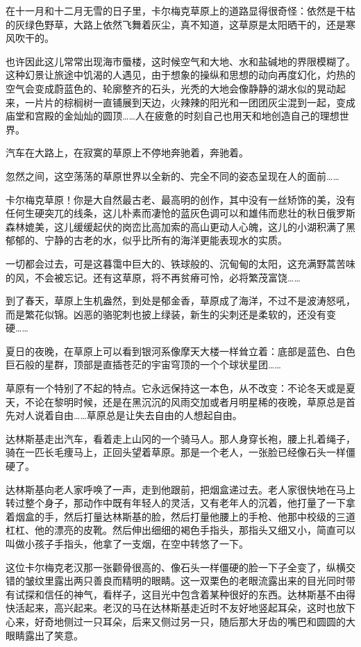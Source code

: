 在十一月和十二月无雪的日子里，卡尔梅克草原上的道路显得很奇怪：依然是干枯的灰绿色野草，大路上依然飞舞着灰尘，真不知道，这草原是太阳晒干的，还是寒风吹干的。

也许因此这儿常常出现海市蜃楼，这时候空气和大地、水和盐碱地的界限模糊了。这种幻景让旅途中饥渴的人遇见，由于想象的操纵和思想的动向再度幻化，灼热的空气会变成蔚蓝色的、轮廓整齐的石头，光秃的大地会像静静的湖水似的晃动起来，一片片的棕榈树一直铺展到天边，火辣辣的阳光和一团团灰尘混到一起，变成庙堂和宫殿的金灿灿的圆顶……人在疲惫的时刻自己也用天和地创造自己的理想世界。

汽车在大路上，在寂寞的草原上不停地奔驰着，奔驰着。

忽然之间，这空荡荡的草原世界以全新的、完全不同的姿态呈现在人的面前……

卡尔梅克草原！你是大自然最古老、最高明的创作，其中没有一丝矫饰的美，没有任何生硬突兀的线条，这儿朴素而凄怆的蓝灰色调可以和雄伟而悲壮的秋日俄罗斯森林媲美，这儿缓缓起伏的岗峦比高加索的高山更动人心魄，这儿的小湖积满了黑郁郁的、宁静的古老的水，似乎比所有的海洋更能表现水的实质。

一切都会过去，可是这暮霭中巨大的、铁球般的、沉甸甸的太阳，这充满野蒿苦味的风，不会被忘记。还有这草原，将不再贫瘠可怜，必将繁茂富饶……

到了春天，草原上生机盎然，到处是郁金香，草原成了海洋，不过不是波涛怒吼，而是繁花似锦。凶恶的骆驼刺也披上绿装，新生的尖刺还是柔软的，还没有变硬……

夏日的夜晚，在草原上可以看到银河系像摩天大楼一样耸立着：底部是蓝色、白色巨石般的星群，顶部是直插苍茫的宇宙穹顶的一个个球状星团……

草原有一个特别了不起的特点。它永远保持这一本色，从不改变：不论冬天或是夏天，不论在黎明时候，还是在黑沉沉的风雨交加或者月明星稀的夜晚，草原总是首先对人说着自由……草原总是让失去自由的人想起自由。

达林斯基走出汽车，看着走上山冈的一个骑马人。那人身穿长袍，腰上扎着绳子，骑在一匹长毛痩马上，正回头望着草原。那是一个老人，一张脸已经像石头一样僵硬了。

达林斯基向老人家呼唤了一声，走到他跟前，把烟盒递过去。老人家很快地在马上转过整个身子，那动作中既有年轻人的灵活，又有老年人的沉着，他打量了一下拿着烟盒的手，然后打量达林斯基的脸，然后打量他腰上的手枪、他那中校级的三道杠杠、他的漂亮的皮靴。然后伸出细细的褐色手指头，那指头又细又小，简直可以叫做小孩子手指头，他拿了一支烟，在空中转悠了一下。

这位卡尔梅克老汉那一张颧骨很高的、像石头一样僵硬的脸一下子全变了，纵横交错的皱纹里露出两只善良而精明的眼睛。这一双栗色的老眼流露出来的目光同时带有试探和信任的神气，看样子，这目光中包含着某种很好的东西。达林斯基不由得快活起来，高兴起来。老汉的马在达林斯基走近时不友好地竖起耳朵，这时也放下心来，好奇地侧过一只耳朵，后来又侧过另一只，随后那大牙齿的嘴巴和圆圆的大眼睛露出了笑意。

